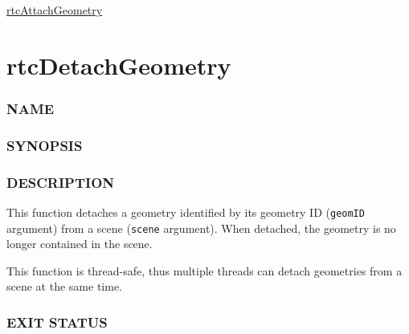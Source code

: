 \hyperref[rtcattachgeometry]{rtcAttachGeometry}

\pagebreak

\section{rtcDetachGeometry}\label{rtcdetachgeometry}

\subsubsection{NAME}\label{name}

\begin{Shaded}
\begin{Highlighting}[]
\OperatorTok{{-}}
\end{Highlighting}
\end{Shaded}

\subsubsection{SYNOPSIS}\label{synopsis}

\begin{Shaded}
\begin{Highlighting}[]

\OperatorTok{(}\OperatorTok{,}  \OperatorTok{);}
\end{Highlighting}
\end{Shaded}

\subsubsection{DESCRIPTION}\label{description}

This function detaches a geometry identified by its geometry ID
(\texttt{geomID} argument) from a scene (\texttt{scene} argument). When
detached, the geometry is no longer contained in the scene.

This function is thread-safe, thus multiple threads can detach
geometries from a scene at the same time.

\subsubsection{EXIT STATUS}\label{exit-status}

